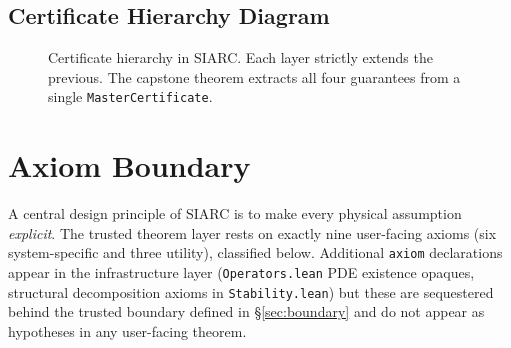 \documentclass[11pt,a4paper]{article}
\theoremstyle{plain}
\theoremstyle{definition}
\theoremstyle{remark}
\begin{document}
\subsection{Certificate Hierarchy Diagram}

\begin{figure}[ht]
\centering
{}
\caption{Certificate hierarchy in SIARC.  Each layer strictly extends the
previous.  The capstone theorem extracts all four guarantees from a
single \texttt{MasterCertificate}.}
\label{fig:hierarchy}
\end{figure}


\section{Axiom Boundary}\label{sec:axioms}

A central design principle of SIARC is to make every physical assumption
\emph{explicit}.  The trusted theorem layer rests on exactly nine user-facing
axioms (six system-specific and three utility), classified
below. Additional \texttt{axiom} declarations appear in the
infrastructure layer (\texttt{Operators.lean} PDE existence
opaques, structural decomposition axioms in
\texttt{Stability.lean}) but these are sequestered behind
the trusted boundary defined in \S\ref{sec:boundary} and
do not appear as hypotheses in any user-facing theorem.
\end{document}
